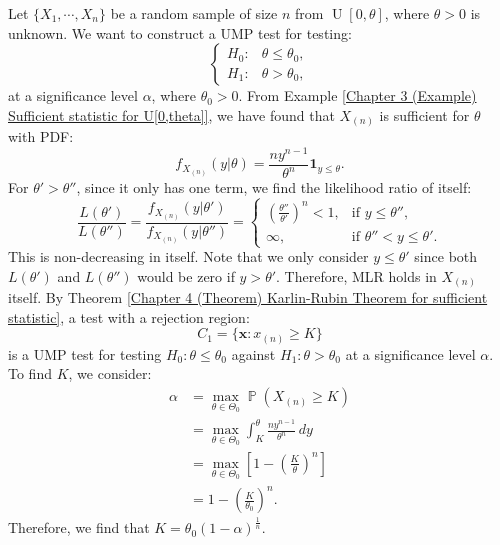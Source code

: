 \documentclass{huhtakm-template-book-v2}
\DeclareMathOperator{\prob}{\mathbb{P}}
\DeclareMathOperator{\U}{U}
\begin{document}
    \begin{eg}
        Let $\{X_{1},\cdots,X_{n}\}$ be a random sample of size $n$ from $\U[0,\theta]$, where $\theta>0$ is unknown. We want to construct a UMP test for testing:
        \begin{equation*}
            \begin{cases}
                H_{0}: &\theta\leq\theta_{0},\\
                H_{1}: &\theta>\theta_{0},
            \end{cases}
        \end{equation*}
        at a significance level $\alpha$, where $\theta_{0}>0$. From Example \ref{Chapter 3 (Example) Sufficient statistic for U[0,theta]}, we have found that $X_{(n)}$ is sufficient for $\theta$ with PDF:
        \begin{equation*}
            f_{X_{(n)}}(y|\theta)=\frac{ny^{n-1}}{\theta^{n}}\mathbf{1}_{y\leq\theta}.
        \end{equation*}
        For $\theta'>\theta''$, since it only has one term, we find the likelihood ratio of itself:
        \begin{equation*}
            \frac{L(\theta')}{L(\theta'')}=\frac{f_{X_{(n)}}(y|\theta')}{f_{X_{(n)}}(y|\theta'')}=\begin{cases}
                \left(\frac{\theta''}{\theta'}\right)^{n}<1, &\text{if } y\leq\theta'',\\
                \infty, &\text{if } \theta''<y\leq\theta'.
            \end{cases}
        \end{equation*}
        This is non-decreasing in itself. Note that we only consider $y\leq\theta'$ since both $L(\theta')$ and $L(\theta'')$ would be zero if $y>\theta'$. Therefore, MLR holds in $X_{(n)}$ itself. By Theorem \ref{Chapter 4 (Theorem) Karlin-Rubin Theorem for sufficient statistic}, a test with a rejection region:
        \begin{equation*}
            C_{1}=\{\mathbf{x}:x_{(n)}\geq K\}
        \end{equation*}
        is a UMP test for testing $H_{0}:\theta\leq\theta_{0}$ against $H_{1}:\theta>\theta_{0}$ at a significance level $\alpha$. To find $K$, we consider:
        \begin{align*}
            \alpha&=\max_{\theta\in\Theta_{0}}\prob(X_{(n)}\geq K)\\
            &=\max_{\theta\in\Theta_{0}}\int_{K}^{\theta}\frac{ny^{n-1}}{\theta^{n}}\,dy\\
            &=\max_{\theta\in\Theta_{0}}\left[1-\left(\frac{K}{\theta}\right)^{n}\right]\\
            &=1-\left(\frac{K}{\theta_{0}}\right)^{n}.
        \end{align*}
        Therefore, we find that $K=\theta_{0}\left(1-\alpha\right)^{\frac{1}{n}}$.
    \end{eg}
\end{document}
